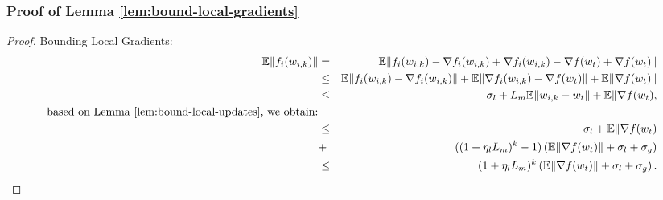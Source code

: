 \subsubsection{Proof of Lemma \ref{lem:bound-local-gradients}}
\begin{proof}
    Bounding Local Gradients:
    \begin{eqnarray}
        \mathbb{E} \Vert f_i(w_{i,k}) \Vert 
        &=& \mathbb{E}\Vert f_i(w_{i,k}) - \nabla f_i(w_{i,k}) + \nabla f_i(w_{i,k}) -\nabla f(w_t)  + \nabla f(w_t) \Vert  \nonumber\\
        &\le& \mathbb{E}\Vert f_i(w_{i,k}) - \nabla f_i(w_{i,k}) \Vert + \mathbb{E}\Vert \nabla f_i(w_{i,k}) -\nabla f(w_t) \Vert + \mathbb{E}\Vert \nabla f(w_t) \Vert  \nonumber\\
        &\le& \sigma_{l} + L_m \mathbb{E}\Vert w_{i,k} - w_t \Vert + \mathbb{E}\Vert \nabla f(w_t) , \nonumber   \\
        \text{based on Lemma \ref{lem:bound-local-updates}, we obtain:}\nonumber\\
        &\le& \sigma_{l}+ \mathbb{E}\Vert \nabla f(w_t)\nonumber\\
        &+& ((1 + \eta_l L_m)^k-1) \left( \mathbb{E}\Vert \nabla f(w_t) \Vert +\sigma_{l} + \sigma_{g} \right)   \nonumber   \\
        &\le& (1 + \eta_l L_m)^k\left( \mathbb{E}\Vert \nabla f(w_t) \Vert +\sigma_{l} + \sigma_{g} \right).  \nonumber  
    \end{eqnarray}
\end{proof}

